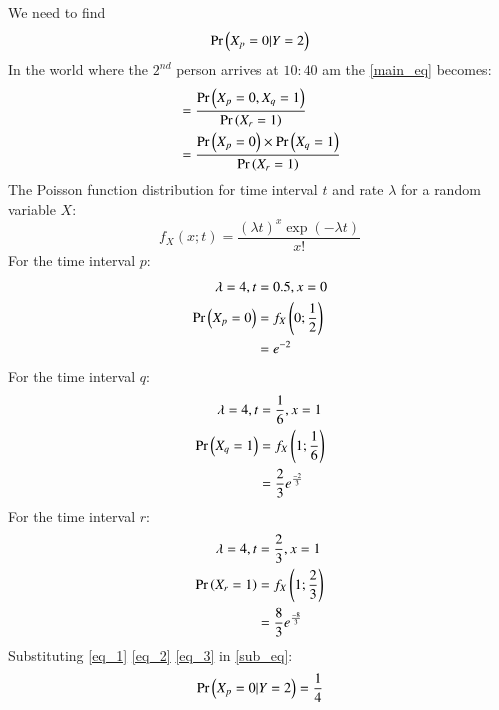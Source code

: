 \begin{table}[h]
    \caption{Random Variables}
    \label{tab:my_label}
\end{table}
We need to find
\begin{align}
    \Pr\left(X_p = 0 | Y = 2\right) \label{main_eq}
\end{align}
In the world where the $2^{nd}$ person arrives at $10:40$ am the \eqref{main_eq} becomes:
\begin{align}
    &=\frac{\Pr\left(X_p = 0, X_q = 1\right)}{\Pr\left(X_r = 1\right)}\\
    &= \frac{\Pr\left(X_p = 0\right) \times \Pr\left(X_q = 1\right)}{\Pr\left(X_r = 1\right)}\label{sub_eq}
\end{align}
The Poisson function distribution for time interval $t$ and rate $\lambda$ for a random variable $X$:
\[
    f_X(x;t) = \frac{(\lambda t)^x \exp{(-\lambda t)}}{x!}
\]
For the time interval $p$:
\begin{align}
    \lambda = 4, t &= 0.5, x= 0\\
    \Pr\left(X_p = 0\right) &= f_X\left(0;\frac{1}{2}\right)\\
    &= e^{-2}\label{eq_1}\\
\end{align}
For the time interval $q$:
\begin{align}
    \lambda = 4, t &= \frac{1}{6},x = 1\\
    \Pr\left(X_q = 1\right) &= f_X\left(1; \frac{1}{6}\right)\\
    &= \frac{2}{3}e^{\frac{-2}{3}} \label{eq_2}
\end{align}
For the time interval $r$:
\begin{align}
    \lambda = 4, t &= \frac{2}{3}, x = 1\\
    \Pr\left(X_r = 1\right) &= f_X\left(1; \frac{2}{3}\right)\\
    &= \frac{8}{3}e^{\frac{-8}{3}} \label{eq_3}
\end{align}
Substituting \eqref{eq_1} \eqref{eq_2} \eqref{eq_3} in \eqref{sub_eq}:
\begin{align}
    \Pr\left(X_p = 0 | Y = 2\right) = \frac{1}{4}
\end{align}